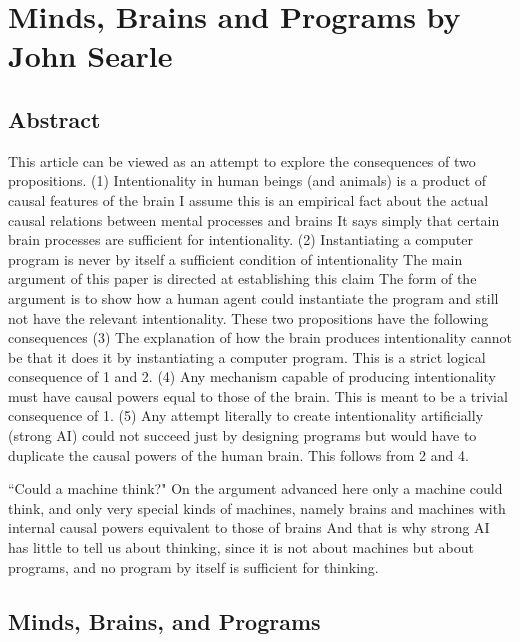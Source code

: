 \chapter{Minds, Brains and Programs by John Searle}\autocite{Searle1}
\label{mindsbrainsprograms}
\section{Abstract}
\setcounter{fn}{\thefootnote}
\setcounter{footnote}{0}

This article can be viewed as an attempt to explore the consequences of two propositions. (1) Intentionality in
human beings (and animals) is a product of causal features of the brain I assume this is an empirical fact about
the actual causal relations between mental processes and brains It says simply that certain brain processes are
sufficient for intentionality. (2) Instantiating a computer program is never by itself a sufficient condition of
intentionality The main argument of this paper is directed at establishing this claim The form of the argument is to
show how a human agent could instantiate the program and still not have the relevant intentionality. These two
propositions have the following consequences (3) The explanation of how the brain produces intentionality
cannot be that it does it by instantiating a computer program. This is a strict logical consequence of 1 and 2. (4)
Any mechanism capable of producing intentionality must have causal powers equal to those of the brain. This is
meant to be a trivial consequence of 1. (5) Any attempt literally to create intentionality artificially (strong AI)
could not succeed just by designing programs but would have to duplicate the causal powers of the human
brain. This follows from 2 and 4.

``Could a machine think?" On the argument advanced here only a machine could think, and only very special
kinds of machines, namely brains and machines with internal causal powers equivalent to those of brains And
that is why strong AI has little to tell us about thinking, since it is not about machines but about programs, and
no program by itself is sufficient for thinking.

\section{Minds, Brains, and Programs}

